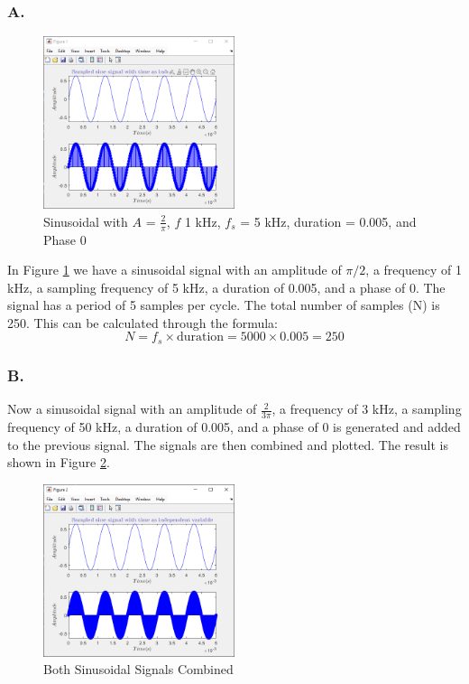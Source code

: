 \documentclass{article}
\begin{document}
\subsubsection*{A.}
\begin{figure}[H]
	\centering
	\includegraphics[width=0.5\textwidth]{fig 3a.png}
	\caption{Sinusoidal with $A$ = $\frac{2}{\pi}$, $f$ 1 kHz, $f_s$ = 5 kHz, duration = 0.005, and Phase 0}
	\label{fig:fig7}
\end{figure}
In Figure \ref{fig:fig7} we have a sinusoidal signal with an amplitude of $\pi/2$, a frequency of 1 kHz,
a sampling frequency of 5 kHz, a duration of 0.005, and a phase of 0. The signal has
a period of 5 samples per cycle. The total number of samples (N) is 250. This can be
calculated through the formula:
\[
N = f_s \times \text{duration} = 5000 \times 0.005 = 250
\]

\subsubsection*{B.}
Now a sinusoidal signal with an amplitude of $\frac{2}{3\pi}$, a frequency of 3 kHz, 
a sampling frequency of 50 kHz, a duration of 0.005, and a phase of 0 is generated and
added to the previous signal. The signals are then combined and plotted. The result is
shown in Figure \ref{fig:fig8}.
\begin{figure}[H]
	\centering
	\includegraphics[width=0.5\textwidth]{fig 3b.png}
	\caption{Both Sinusoidal Signals Combined}
	\label{fig:fig8}
\end{figure}
\end{document}
